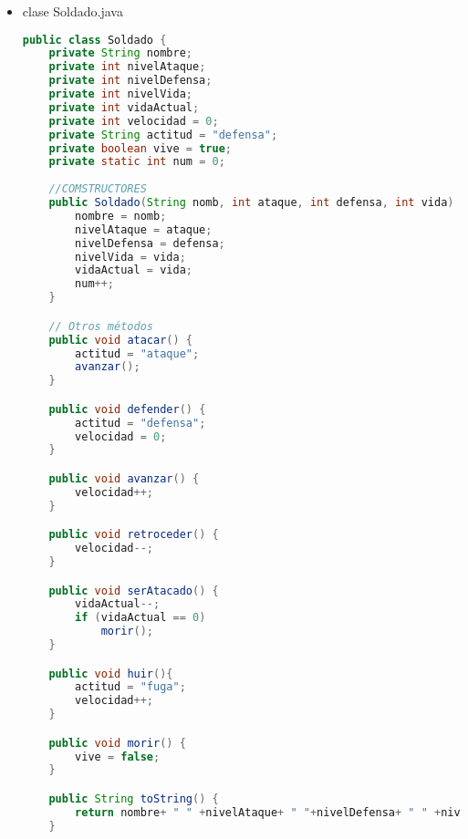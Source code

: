 \documentclass{article}
\begin{document}
\begin{itemize}
\begin{lstlisting}[language=java]
            // Crear un soldado aleatorio (puedes ajustar estos valores según tus necesidades)
            Soldado soldado = new Soldado("Soldado" + i, 8, 5, rand.nextInt(5) + 5);
            tablero[fila][columna] = soldado;
        }
    }

    // Método para mostrar el tablero
    public void mostrarTablero() {
        System.out.println("Mapa - Tipo de Territorio: " + tipoTerritorio);
        for (Soldado[] fila : tablero) {
            for (Soldado soldado : fila) {
                if (soldado != null) {
                    System.out.print(soldado.getNombre() + " ");
                } else {
                    System.out.print("Vacío ");
                }
            }
            System.out.println();
        }
    }
}
        \end{lstlisting}

        \item clase Soldado.java
        \begin{lstlisting}[language=java]
public class Soldado {
	private String nombre;
    private int nivelAtaque;
    private int nivelDefensa;
    private int nivelVida;
    private int vidaActual;
    private int velocidad = 0;
    private String actitud = "defensa";
    private boolean vive = true;
    private static int num = 0;
	
    //COMSTRUCTORES
	public Soldado(String nomb, int ataque, int defensa, int vida) {
		nombre = nomb;
        nivelAtaque = ataque;
        nivelDefensa = defensa;
        nivelVida = vida;
        vidaActual = vida;
        num++;
	}

	// Otros métodos
    public void atacar() {
        actitud = "ataque";
        avanzar();
    }

    public void defender() {
        actitud = "defensa";
        velocidad = 0;
    }

    public void avanzar() {
        velocidad++;
    }

    public void retroceder() {
        velocidad--;
    }

    public void serAtacado() {
        vidaActual--;
        if (vidaActual == 0) 
            morir();
    }

    public void huir(){
        actitud = "fuga";
        velocidad++;
    }

    public void morir() {
        vive = false;
    }

    public String toString() {
        return nombre+ " " +nivelAtaque+ " "+nivelDefensa+ " " +nivelVida+ " " +vidaActual+ " " +velocidad+ " " +actitud+ " " +vive;
    }


\end{lstlisting}
\end{itemize}
\end{document}
